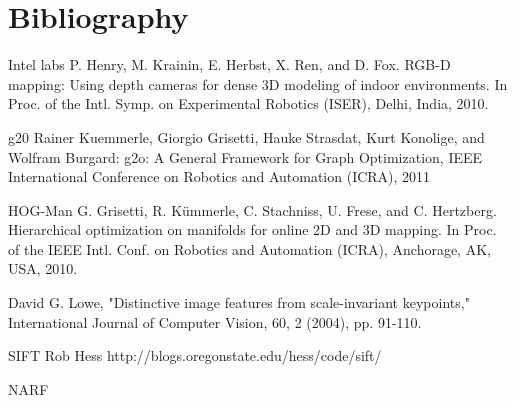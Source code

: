 \documentclass[a4paper,11pt]{kth-mag}
\begin{document}
\chapter{Bibliography}

Intel labs
P. Henry, M. Krainin, E. Herbst, X. Ren, and D. Fox. RGB-D mapping:
Using depth cameras for dense 3D modeling of indoor environments.
In Proc. of the Intl. Symp. on Experimental Robotics (ISER), Delhi,
India, 2010.

g20
Rainer Kuemmerle, Giorgio Grisetti, Hauke Strasdat, Kurt Konolige, and Wolfram Burgard: g2o: A General Framework for Graph Optimization, IEEE International Conference on Robotics and Automation (ICRA), 2011

HOG-Man
G. Grisetti, R. K\"ummerle, C. Stachniss, U. Frese, and C. Hertzberg.
Hierarchical optimization on manifolds for online 2D and 3D mapping.
In Proc. of the IEEE Intl. Conf. on Robotics and Automation (ICRA),
Anchorage, AK, USA, 2010.

David G. Lowe, "Distinctive image features from scale-invariant keypoints," International Journal of Computer Vision, 60, 2 (2004), pp. 91-110.

SIFT Rob Hess
http://blogs.oregonstate.edu/hess/code/sift/

NARF
\end{document}

